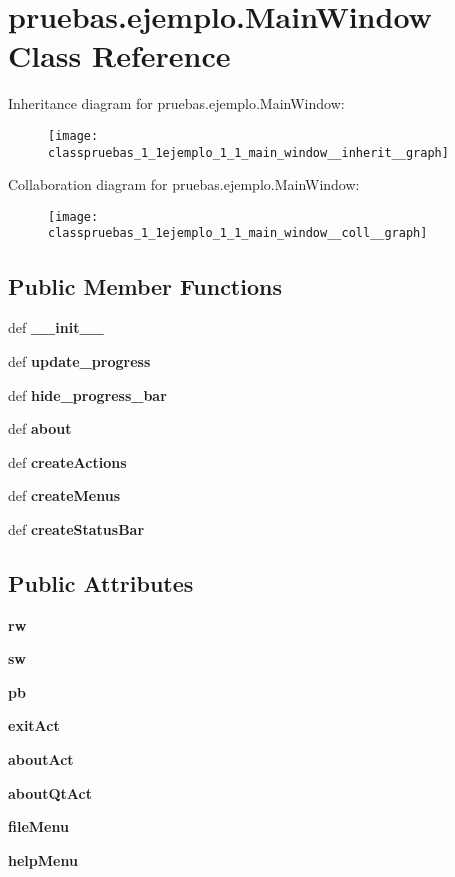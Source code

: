 \section{pruebas.\-ejemplo.\-Main\-Window \-Class \-Reference}
\label{classpruebas_1_1ejemplo_1_1_main_window}


\-Inheritance diagram for pruebas.\-ejemplo.\-Main\-Window\-:\nopagebreak
\begin{figure}[H]
\begin{center}
\leavevmode
\texttt{[image: classpruebas\_1\_1ejemplo\_1\_1\_main\_window\_\_inherit\_\_graph]}
\end{center}
\end{figure}


\-Collaboration diagram for pruebas.\-ejemplo.\-Main\-Window\-:\nopagebreak
\begin{figure}[H]
\begin{center}
\leavevmode
\texttt{[image: classpruebas\_1\_1ejemplo\_1\_1\_main\_window\_\_coll\_\_graph]}
\end{center}
\end{figure}
\subsection*{\-Public \-Member \-Functions}
\begin{DoxyCompactItemize}
\item 
def {\bf \-\_\-\-\_\-init\-\_\-\-\_\-}
\item 
def {\bf update\-\_\-progress}
\item 
def {\bf hide\-\_\-progress\-\_\-bar}
\item 
def {\bf about}
\item 
def {\bf create\-Actions}
\item 
def {\bf create\-Menus}
\item 
def {\bf create\-Status\-Bar}
\end{DoxyCompactItemize}
\subsection*{\-Public \-Attributes}
\begin{DoxyCompactItemize}
\item 
{\bf rw}
\item 
{\bf sw}
\item 
{\bf pb}
\item 
{\bf exit\-Act}
\item 
{\bf about\-Act}
\item 
{\bf about\-Qt\-Act}
\item 
{\bf file\-Menu}
\item 
{\bf help\-Menu}
\end{DoxyCompactItemize}


